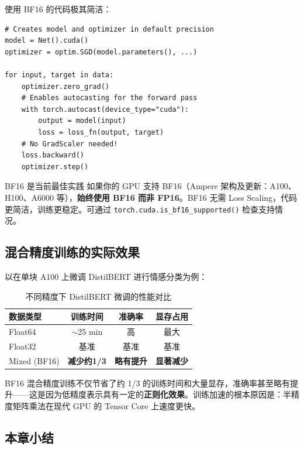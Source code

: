 \documentclass[a4paper]{article}
\begin{document}
使用 BF16 的代码极其简洁：

\begin{lstlisting}[caption={PyTorch 中的 BF16 混合精度训练（无需 GradScaler）}]
# Creates model and optimizer in default precision
model = Net().cuda()
optimizer = optim.SGD(model.parameters(), ...)

for input, target in data:
    optimizer.zero_grad()
    # Enables autocasting for the forward pass
    with torch.autocast(device_type="cuda"):
        output = model(input)
        loss = loss_fn(output, target)
    # No GradScaler needed!
    loss.backward()
    optimizer.step()
\end{lstlisting}

\begin{importantbox}{BF16 是当前最佳实践}
如果你的 GPU 支持 BF16（Ampere 架构及更新：A100、H100、A6000 等），\textbf{始终使用 BF16 而非 FP16}。BF16 无需 Loss Scaling，代码更简洁，训练更稳定。可通过 \texttt{torch.cuda.is\_bf16\_supported()} 检查支持情况。
\end{importantbox}

\subsection{混合精度训练的实际效果}

以在单块 A100 上微调 DistilBERT 进行情感分类为例：

\begin{table}[H]
\centering
\begin{tabular}{lccc}
\toprule
\textbf{数据类型} & \textbf{训练时间} & \textbf{准确率} & \textbf{显存占用} \\
\midrule
Float64      & $\sim$25 min & 高 & 最大 \\
Float32      & 基准     & 基准 & 基准 \\
Mixed (BF16) & \textbf{减少约1/3} & \textbf{略有提升} & \textbf{显著减少} \\
\bottomrule
\end{tabular}
\caption{不同精度下 DistilBERT 微调的性能对比}
\end{table}

BF16 混合精度训练不仅节省了约 1/3 的训练时间和大量显存，准确率甚至略有提升——这是因为低精度表示具有一定的\textbf{正则化效果}。训练加速的根本原因是：半精度矩阵乘法在现代 GPU 的 Tensor Core 上速度更快。

\subsection{本章小结}
\end{document}

